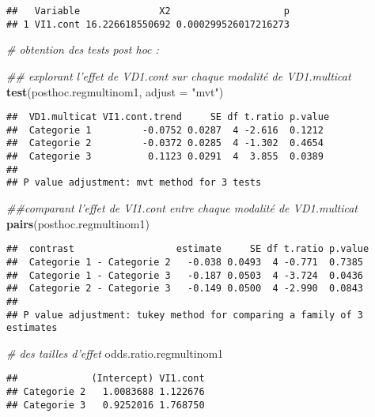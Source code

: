 \documentclass[
]{book}
\newenvironment{Shaded}{\begin{snugshade}}{\end{snugshade}}
\newcommand{\CommentTok}[1]{\textcolor[rgb]{0.56,0.35,0.01}{\textit{#1}}}
\newcommand{\DataTypeTok}[1]{\textcolor[rgb]{0.13,0.29,0.53}{#1}}
\newcommand{\KeywordTok}[1]{\textcolor[rgb]{0.13,0.29,0.53}{\textbf{#1}}}
\newcommand{\NormalTok}[1]{#1}
\newcommand{\StringTok}[1]{\textcolor[rgb]{0.31,0.60,0.02}{#1}}
\begin{document}
\begin{verbatim}
##   Variable              X2                    p
## 1 VI1.cont 16.226618550692 0.000299526017216273
\end{verbatim}

\begin{Shaded}
\begin{Highlighting}[]
\CommentTok{# obtention des tests post hoc :}

\CommentTok{## explorant l'effet de VD1.cont sur chaque modalité de VD1.multicat}
\KeywordTok{test}\NormalTok{(posthoc.regmultinom1, }\DataTypeTok{adjust =} \StringTok{"mvt"}\NormalTok{)}
\end{Highlighting}
\end{Shaded}

\begin{verbatim}
##  VD1.multicat VI1.cont.trend     SE df t.ratio p.value
##  Categorie 1         -0.0752 0.0287  4 -2.616  0.1212 
##  Categorie 2         -0.0372 0.0285  4 -1.302  0.4654 
##  Categorie 3          0.1123 0.0291  4  3.855  0.0389 
## 
## P value adjustment: mvt method for 3 tests
\end{verbatim}

\begin{Shaded}
\begin{Highlighting}[]
\CommentTok{##comparant l'effet de VI1.cont entre chaque modalité de VD1.multicat}
\KeywordTok{pairs}\NormalTok{(posthoc.regmultinom1)}
\end{Highlighting}
\end{Shaded}

\begin{verbatim}
##  contrast                  estimate     SE df t.ratio p.value
##  Categorie 1 - Categorie 2   -0.038 0.0493  4 -0.771  0.7385 
##  Categorie 1 - Categorie 3   -0.187 0.0503  4 -3.724  0.0436 
##  Categorie 2 - Categorie 3   -0.149 0.0500  4 -2.990  0.0843 
## 
## P value adjustment: tukey method for comparing a family of 3 estimates
\end{verbatim}

\begin{Shaded}
\begin{Highlighting}[]
\CommentTok{# des tailles d'effet}
\NormalTok{odds.ratio.regmultinom1}
\end{Highlighting}
\end{Shaded}

\begin{verbatim}
##             (Intercept) VI1.cont
## Categorie 2   1.0083688 1.122676
## Categorie 3   0.9252016 1.768750
\end{verbatim}
\end{document}
